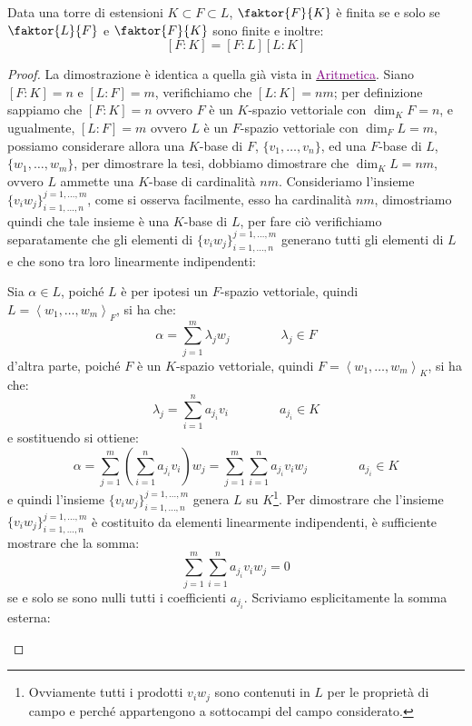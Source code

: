 \documentclass[11pt]{scrartcl}
\begin{document}
\begin{proposition}
    \label{torri}
    Data una torre di estensioni $K \subset F \subset L$, $\faktor{F}{K}$ è finita se e solo se $\faktor{L}{F}$ e $\faktor{F}{K}$ sono finite e inoltre:
    \[ [F:K] = [F:L][L:K]
        \]
\end{proposition}

\begin{proof}
    La dimostrazione è identica a quella già vista in \href{https://github.com/diego-unipi/Appunti-Aritmetica}{\textcolor{purple}{Aritmetica}}. Siano $[F:K] = n$ e $[L:F] = m$, verifichiamo che $[L:K]=nm$;
    per definizione sappiamo che $[F:K] = n$ ovvero $F$ è un $K$-spazio vettoriale con $\dim_KF = n$, e ugualmente, $[L:F] = m$ ovvero $L$ è un $F$-spazio vettoriale con $\dim_FL = m$, possiamo considerare allora una $K$-base di $F$, $\{v_1,\ldots,v_n\}$, ed una $F$-base di $L$, $\{w_1,\ldots,w_m\}$, per dimostrare la tesi, dobbiamo dimostrare che $\dim_KL = nm$, ovvero $L$ ammette una $K$-base di cardinalità $nm$. Consideriamo l'insieme $\{v_iw_j\}_{i=1,\ldots,n}^{j=1,\ldots,m}$, come si osserva facilmente, esso ha cardinalità $nm$, dimostriamo quindi che tale insieme è una $K$-base di $L$, per fare ciò verifichiamo separatamente che gli elementi di $\{v_iw_j\}_{i=1,\ldots,n}^{j=1,\ldots,m}$ generano tutti gli elementi di $L$ e che sono tra loro linearmente indipendenti:
	\begin{itemize}
	\ii Sia $\alpha \in L$, poiché $L$ è per ipotesi un $F$-spazio vettoriale, quindi $L = \left<w_1,\ldots,w_m\right>_F$, si ha che:
		\[ \alpha = \sum_{j=1}^{m} \lambda_jw_j
		\qquad\qquad \lambda_j \in F
		\]
		d'altra parte, poiché $F$ è un $K$-spazio vettoriale, quindi $F = \left<w_1,\ldots,w_m\right>_K$, si ha che:
		\[ \lambda_j = \sum_{i=1}^{n} a_{j_i}v_i
		\qquad\qquad a_{j_i} \in K
		\]
		e sostituendo si ottiene:
		\[ \alpha = \sum_{j=1}^{m} \left( \sum_{i=1}^{n} a_{j_i}v_i\right)w_j = \sum_{j=1}^{m}\sum_{i=1}^{n} a_{j_i}v_iw_j
		\qquad\qquad a_{j_i} \in K
		\]
    e quindi l'insieme $\{v_iw_j\}_{i=1,\ldots,n}^{j=1,\ldots,m}$ genera $L$ su $K$\footnote{Ovviamente tutti i prodotti $v_iw_j$ sono contenuti in $L$ per le proprietà di campo e perché appartengono a sottocampi del campo considerato.}.
	\ii Per dimostrare che l'insieme $\{v_iw_j\}_{i=1,\ldots,n}^{j=1,\ldots,m}$ è costituito da elementi linearmente indipendenti, è sufficiente mostrare che la somma:
		\[ \sum_{j=1}^{m}\sum_{i=1}^{n} a_{j_i}v_iw_j = 0
		\]
    se e solo se sono nulli tutti i coefficienti $a_{j_i}$. Scriviamo esplicitamente la somma esterna:

\end{itemize}
\end{proof}
\end{document}
